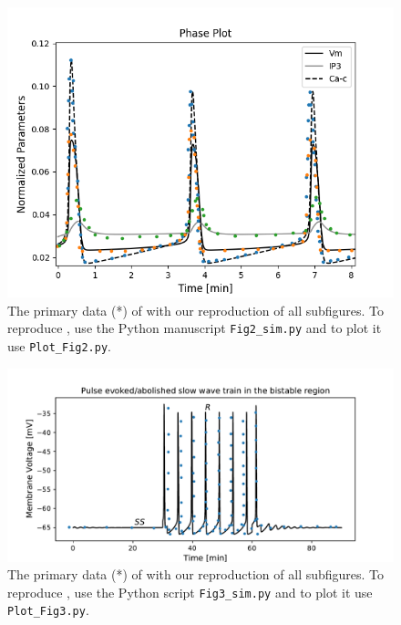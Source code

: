 \documentclass[fleqn,10pt]{physiome}
\begin{document}
\begin{figure}[ht!]%
\includegraphics[width=1.0\linewidth]{Figure_2.png}
\caption{The primary data (*) of \cite[Figure 2A]{imtiaz2002theoretical} with our reproduction of all subfigures. To reproduce \cite[Figure 2A]{imtiaz2002theoretical}, use the Python manuscript \texttt{Fig2\_sim.py} and to plot it use \texttt{Plot\_Fig2.py}.}
\label{fig:fig2}
\end{figure}

\begin{figure}[ht!]%
\includegraphics[width=1.0\linewidth]{Figure_3.pdf}
\caption{The primary data (*) of \cite[Figure 3A]{imtiaz2002theoretical} with our reproduction of all subfigures. To reproduce \cite[Figure 3A]{imtiaz2002theoretical}, use the Python script \texttt{Fig3\_sim.py} and to plot it use \texttt{Plot\_Fig3.py}.}
\label{fig:fig3}
\end{figure}
\end{document}
